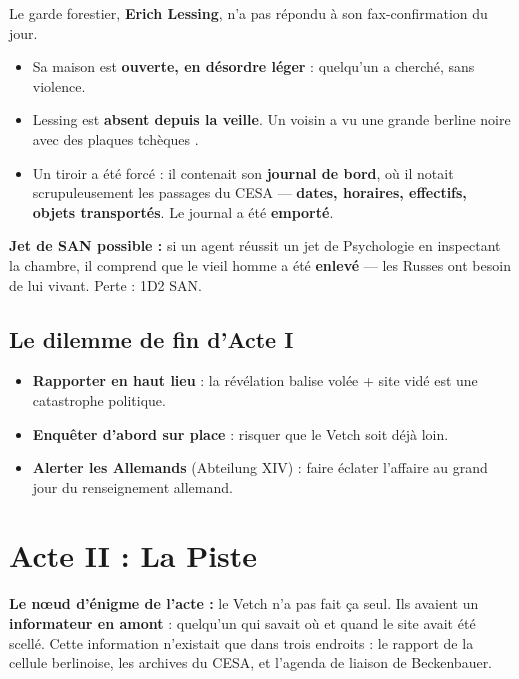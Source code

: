 \documentclass[10pt,a5paper,twoside]{book}
\begin{document}
Le garde forestier, \textbf{Erich Lessing}, n'a pas répondu à son fax-confirmation du jour.

\begin{itemize}
	\item Sa maison est \textbf{ouverte, en désordre léger} : quelqu'un a cherché, sans violence.
	\item Lessing est \textbf{absent depuis la veille}. Un voisin a vu \og une grande berline noire avec des plaques tchèques \fg.
	\item Un tiroir a été forcé : il contenait son \textbf{journal de bord}, où il notait scrupuleusement les passages du CESA --- \textbf{dates, horaires, effectifs, objets transportés}. Le journal a été \textbf{emporté}.
\end{itemize}

\begin{shaded}
\textbf{Jet de SAN possible :} si un agent réussit un jet de Psychologie en inspectant la chambre, il comprend que le vieil homme a été \textbf{enlevé} --- les Russes ont besoin de lui vivant. Perte : 1D2 SAN.
\end{shaded}

\clearpage

\subsection{Le dilemme de fin d'Acte I}

\begin{itemize}
	\item \textbf{Rapporter en haut lieu} : la révélation \og balise volée + site vidé \fg{} est une catastrophe politique.
	\item \textbf{Enquêter d'abord sur place} : risquer que le Vetch soit déjà loin.
	\item \textbf{Alerter les Allemands} (Abteilung XIV) : faire éclater l'affaire au grand jour du renseignement allemand.
\end{itemize}

\clearpage

\section{Acte II : La Piste}

\begin{shaded}
\textbf{Le nœud d'énigme de l'acte :} le Vetch n'a pas fait ça seul. Ils avaient un \textbf{informateur en amont} : quelqu'un qui savait où et quand le site avait été scellé. Cette information n'existait que dans trois endroits : le rapport de la cellule berlinoise, les archives du CESA, et l'agenda de liaison de Beckenbauer.
\end{shaded}
\end{document}
